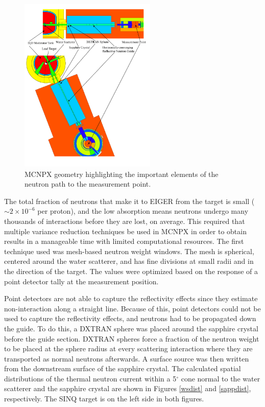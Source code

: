 \documentclass[a4paper,
              ]{jacow}
\begin{document}
\begin{figure}[!htb]
   \centering
   \includegraphics*[trim = 0mm 25mm 0mm 10mm, width=65mm]{graphics/geom.pdf}
   \caption{MCNPX geometry highlighting the important elements of the neutron path to the measurement point.}
   \label{geom}
\end{figure}

The total fraction of neutrons that make it to EIGER from the target is small ($\sim 2 \times 10^{-6}$ per proton), and the low absorption means neutrons undergo many thousands of interactions before they are lost, on average.  This required that multiple variance reduction techniques be used in MCNPX in order to obtain results in a manageable time with limited computational resources.  The first technique used was mesh-based neutron weight windows.  The mesh is spherical, centered around the water scatterer, and has fine divisions at small radii and in the direction of the target.  The values were optimized based on the response of a point detector tally at the measurement position.  




Point detectors are not able to capture the reflectivity effects since they estimate non-interaction along a straight line.  Because of this, point detectors could not be used to capture the reflectivity effects, and neutrons had to be propagated down the guide.  To do this, a DXTRAN sphere was placed around the sapphire crystal before the guide section.  DXTRAN spheres force a fraction of the neutron weight to be placed at the sphere radius at every scattering interaction where they are transported as normal neutrons afterwards.  A surface source was then written from the downstream surface of the sapphire crystal.  The calculated spatial distributions of the thermal neutron current within a 5$^\circ$ cone normal to the water scatterer and the sapphire crystal are shown in Figures \ref{wsdist} and \ref{sappdist}, respectively.  The SINQ target is on the left side in both figures.
\end{document}
